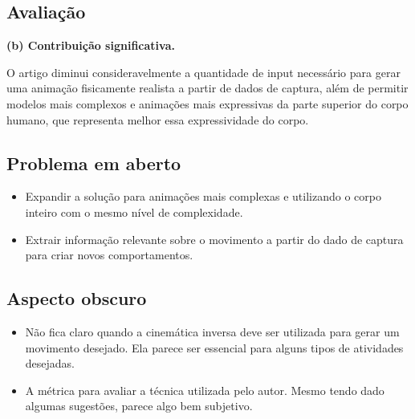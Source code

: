 \subsection{Avaliação}
 \textbf{(b) Contribuição significativa.}

O artigo diminui consideravelmente a quantidade de input necessário para gerar uma animação fisicamente realista a partir de dados de captura, além de permitir modelos mais complexos e animações mais expressivas da parte superior do corpo humano, que representa melhor essa expressividade do corpo.

\subsection{Problema em aberto}
 \begin{itemize}
   \item Expandir a solução para animações mais complexas e utilizando o corpo inteiro com o mesmo nível de complexidade.
   \item Extrair informação relevante sobre o movimento a partir do dado de captura para criar novos comportamentos.
 \end{itemize}  

\subsection{Aspecto obscuro}
 \begin{itemize}
   \item Não fica claro quando a cinemática inversa deve ser utilizada para gerar um movimento desejado. Ela parece ser essencial para alguns tipos de atividades desejadas.
   \item A métrica para avaliar a técnica utilizada pelo autor. Mesmo tendo dado algumas sugestões, parece algo bem subjetivo.
 \end{itemize}  